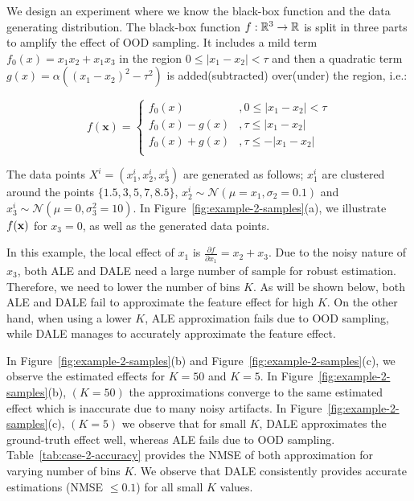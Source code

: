 We design an experiment where we know the black-box function and the
data generating distribution. The black-box function
\(f:\mathbb{R}^3 \rightarrow \mathbb{R}\) is split in three parts to amplify the
effect of OOD sampling. It includes a mild term
\( f_0(x) = x_1x_2 + x_1x_3 \) in the region
\( 0 \leq |x_1 - x_2| < \tau \) and then a quadratic term
\(g(x) = \alpha ((x_1 - x_2)^2 - \tau^2)\) is added(subtracted)
over(under) the region, i.e.:

\begin{equation} \label{eq:example-2-mapping}
  f(\mathbf{x}) =
  \begin{cases}
    f_0(x) & , 0 \leq |x_1 - x_2|  < \tau \\
    f_0(x) - g(x) & , \tau \leq |x_1 - x_2|  \\
    f_0(x) + g(x) & , \tau \leq - |x_1 - x_2|  \\
  \end{cases}
\end{equation}

\noindent

The data points \(X^i = (x_1^i, x_2^i, x_3^i)\) are generated as
follows; \(x_1^i \) are clustered around the points
\(\{1.5, 3, 5, 7, 8.5\}\),
\(x_2^i \sim \mathcal{N}(\mu=x_1, \sigma_2=0.1) \) and
\(x_3^i \sim \mathcal{N}(\mu=0, \sigma_3^2=10) \). In
Figure~\ref{fig:example-2-samples}(a), we illustrate \(f(\mathbf{x})\) for
\(x_3=0\), as well as the generated data points.

In this example, the local effect of \(x_1\) is
\(\frac{\partial f}{\partial x_1} = x_2 + x_3\). Due to the noisy
nature of \(x_3\), both ALE and DALE need a large number of sample for
robust estimation. Therefore, we need to lower the number of bins
\(K\). As will be shown below, both ALE and DALE fail to approximate
the feature effect for high \(K\). On the other hand, when using a
lower \(K\), ALE approximation fails due to OOD sampling, while DALE
manages to accurately approximate the feature effect.

In Figure~\ref{fig:example-2-samples}(b) and
Figure~\ref{fig:example-2-samples}(c), we observe the estimated
effects for \(K=50\) and \(K=5\). In
Figure~\ref{fig:example-2-samples}(b), \((K=50)\) the approximations
converge to the same estimated effect which is inaccurate due to many
noisy artifacts. In Figure~\ref{fig:example-2-samples}(c), \((K=5)\)
we observe that for small \(K\), DALE approximates the ground-truth
effect well, whereas ALE fails due to OOD
sampling. Table~\ref{tab:case-2-accuracy} provides the NMSE of both
approximation for varying number of bins \(K\). We observe that DALE
consistently provides accurate estimations (NMSE \(\leq 0.1\)) for all
small \(K\) values.

